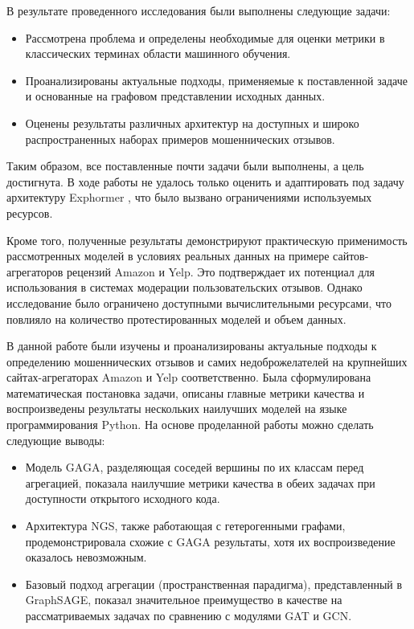 
В результате проведенного исследования были выполнены следующие задачи:

\begin{itemize}
    \item Рассмотрена проблема и определены необходимые для оценки метрики в классических терминах области машинного обучения.

    \item Проанализированы актуальные подходы, применяемые к поставленной задаче и основанные на графовом представлении исходных данных.

    \item Оценены результаты различных архитектур на доступных и широко распространенных наборах примеров мошеннических отзывов.
\end{itemize}

Таким образом, все поставленные почти задачи были выполнены, а цель достигнута. В ходе работы не удалось только оценить и адаптировать под задачу архитектуру Exphormer \cite{shirzad2023}, что было вызвано ограничениями используемых ресурсов.

Кроме того, полученные результаты демонстрируют практическую применимость рассмотренных моделей в условиях реальных данных на примере сайтов-агрегаторов рецензий Amazon и Yelp. Это подтверждает их потенциал для использования в системах модерации пользовательских отзывов. Однако исследование было ограничено доступными вычислительными ресурсами, что повлияло на количество протестированных моделей и объем данных.

\pagebreak




В данной работе были изучены и проанализированы актуальные подходы к определению мошеннических отзывов и самих недоброжелателей на крупнейших сайтах-агрегаторах Amazon и Yelp соответственно. Была сформулирована математическая постановка задачи, описаны главные метрики качества и воспроизведены результаты нескольких наилучших моделей на языке программирования Python. На основе проделанной работы можно сделать следующие выводы:

\begin{itemize}
    \item Модель GAGA, разделяющая соседей вершины по их классам перед агрегацией, показала наилучшие метрики качества в обеих задачах при доступности открытого исходного кода.

    \item Архитектура NGS, также работающая с гетерогенными графами, продемонстрировала схожие с GAGA результаты, хотя их воспроизведение оказалось невозможным.

    \item Базовый подход агрегации (пространственная парадигма), представленный в GraphSAGE, показал значительное преимущество в качестве на рассматриваемых задачах по сравнению с модулями GAT и GCN.
\end{itemize}

